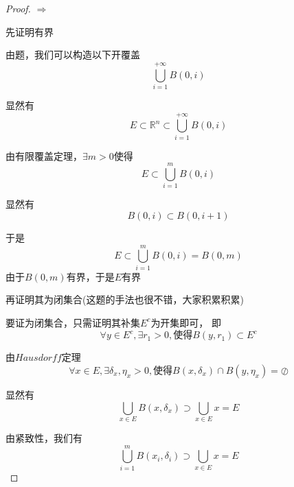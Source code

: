 \documentclass[lang=cn,10pt]{elegantbook}
\begin{document}
	\begin{proof}
		
		$\Rightarrow$
		
		先证明有界
		
		由题，我们可以构造以下开覆盖
		\begin{equation*}
			\bigcup_{i=1}^{+\infty}{B\left( 0,i \right)}
		\end{equation*}
		
		显然有
		\begin{equation*}
			E\subset\mathbb{R} ^n \subset	\bigcup_{i=1}^{+\infty}{B\left( 0,i \right)}
		\end{equation*}
		
		由有限覆盖定理，$\exists m>0$使得
		\begin{equation*}
			E\subset	\bigcup_{i=1}^{m}{B\left( 0,i \right)}
		\end{equation*}
		
		显然有
		\begin{equation*}
			B(0,i)\subset B(0,i+1)
		\end{equation*}
		
		于是
		\begin{equation*}
			E\subset	\bigcup_{i=1}^{m}{B\left( 0,i \right)}=B(0,m)
		\end{equation*}
		由于$ B(0,m)$有界，于是$E$有界
		
		再证明其为闭集合(这题的手法也很不错，大家积累积累)
		
		要证为闭集合，只需证明其补集$E^{c}$为开集即可，
		即
		\begin{equation*}
			\forall y\in E^c,\exists r_1>0,\text{使得}B\left( y,r_1 \right) \subset E^c
		\end{equation*}
		
		由$Hausdorff$定理
		\begin{equation*}
			\forall x\in E,\exists \delta _x,\eta _x>0,\text{使得}B\left( x,\delta _x \right) \cap B\left( y,\eta _x \right) =\oslash 
		\end{equation*}
		
		显然有
		\begin{equation*}
			\bigcup_{x\in E}{B\left( x,\delta _x \right)}\supset \bigcup_{x\in E}{x}=E
		\end{equation*}
		
		由紧致性，我们有
		\begin{equation*}
			\bigcup_{i=1}^m{B\left( x_i,\delta _i \right)}\supset \bigcup_{x\in E}{x}=E
		\end{equation*}
		

\end{proof}
\end{document}
